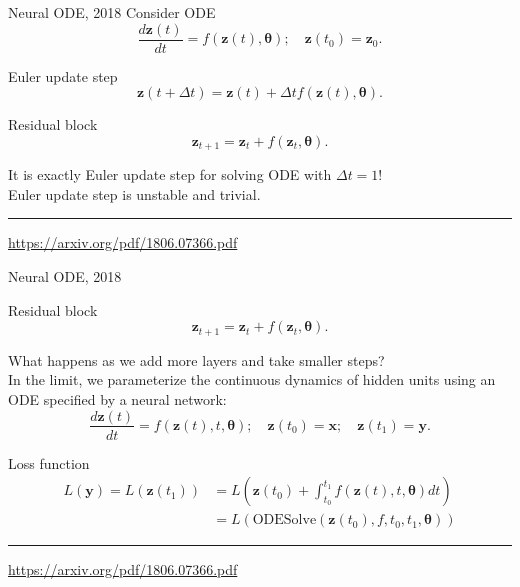 \documentclass{beamer}
\newcommand{\bx}{\mathbf{x}}
\newcommand{\bz}{\mathbf{z}}
\newcommand{\by}{\mathbf{y}}
\newcommand{\btheta}{\boldsymbol{\theta}}
\begin{document}
\begin{frame}{Neural ODE, 2018}
Consider ODE    
\vspace{-0.2cm}
\[
    \frac{d \bz(t)}{dt} = f(\bz(t), \btheta); \quad \bz(t_0) = \bz_0.
\]
\vspace{-0.2cm}
\begin{block}{Euler update step}
\vspace{-0.2cm}
\[
    \bz(t + \Delta t) = \bz(t) + \Delta t f(\bz(t), \btheta).
\]
\vspace{-0.2cm}
\end{block}
\begin{block}{Residual block}
\vspace{-0.2cm}
\[
    \bz_{t+1} = \bz_t + f(\bz_t, \btheta).
\]
\vspace{-0.2cm}
\end{block}
It is exactly Euler update step for solving ODE with $\Delta t = 1$! \\
Euler update step is unstable and trivial. \\
 \vfill
\hrule\medskip
{\scriptsize \href{https://arxiv.org/pdf/1806.07366.pdf}{https://arxiv.org/pdf/1806.07366.pdf}}   
\end{frame}
\begin{frame}{Neural ODE, 2018}
\begin{block}{Residual block}
\vspace{-0.2cm}
\[
    \bz_{t+1} = \bz_t + f(\bz_t, \btheta).
\]
\vspace{-0.2cm}
\end{block}
What happens as we add more layers and take smaller steps? \\
In the limit, we parameterize the continuous dynamics of hidden units using an ODE specified by a neural network: 
\[
    \frac{d \bz(t)}{dt} = f(\bz(t), t, \btheta); \quad \bz(t_0) = \bx; \quad \bz(t_1) = \by.
\]
\vspace{-0.2cm}
\begin{block}{Loss function}
\vspace{-0.2cm}
\begin{align*}
    L(\by) = L(\bz(t_1)) &= L\left( \bz(t_0) + \int_{t_0}^{t_1} f(\bz(t), t, \btheta) dt \right) \\ &= L\left(\text{ODESolve}(\bz(t_0), f, t_0,t_1, \btheta) \right)
\end{align*}
\vspace{-0.2cm}
\end{block}
 \vfill
\hrule\medskip
{\scriptsize \href{https://arxiv.org/pdf/1806.07366.pdf}{https://arxiv.org/pdf/1806.07366.pdf}}   
\end{frame}
\end{document}
